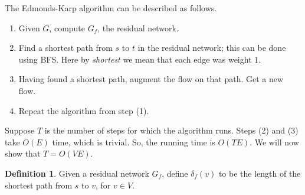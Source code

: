 \documentclass[12pt,a4paper]{amsart}
\numberwithin{equation}{section}
\theoremstyle{definition}
\newtheorem{Def}{Definition}[section]
\begin{document}
The Edmonds-Karp algorithm can be described as follows. 
\begin{enumerate}
	\item Given $G$, compute $G_f$, the residual network.
	\item Find a shortest path from $s$ to $t$ in the residual network; this can be done using BFS. Here by \textit{shortest} we mean that each edge was weight $1$. 
	\item Having found a shortest path, augment the flow on that path. Get a new flow.
	\item Repeat the algorithm from step (1). 
\end{enumerate}
Suppose $T$ is the number of steps for which the algorithm runs. Steps (2) and (3) take $O(E)$ time, which is trivial. So, the running time is $O(TE)$. We will now show that $T = O(VE)$. 

\newcommand{\shortestResidualPath}[2]{\delta_{#1}(#2)}
\begin{Def}
	Given a residual network $G_f$, define $\shortestResidualPath{f}{v}$ to be the length of the shortest path from $s$ to $v$, for $v\in V$. 
\end{Def}
\end{document}
